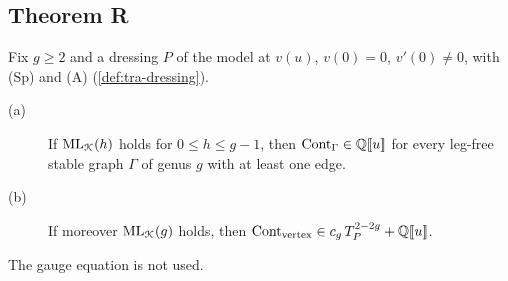\subsection{Theorem R}
\label{sec:red-thm}

\begin{thm}[Theorem R]
\label{thm:red-main}
Fix $g\geq 2$ and a dressing $P$ of the model at $v(u)$, $v(0) = 0$, $v'(0)\neq 0$, with (Sp) and (A) (\cref{def:tra-dressing}).
\begin{description}
\item[(a)] If $\mathrm{ML}_{\mathcal{K}}(h)$ holds for $0\leq h\leq g-1$, then $\mathrm{Cont}_\Gamma\in\mathbb{Q}[\![ u ]\!]$ for every leg-free stable graph $\Gamma$ of genus $g$ with at least one edge.
\item[(b)] If moreover $\mathrm{ML}_{\mathcal{K}}(g)$ holds, then $\mathrm{Cont}_{\mathrm{vertex}}\in c_g\,T_P^{2-2g}+\mathbb{Q}[\![ u ]\!]$.
\end{description}
The gauge equation is not used.
\end{thm}


